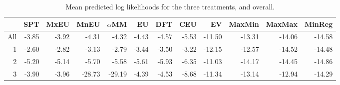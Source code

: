 \begin{table}[!htb]
\centering
\begin{tabular}{rrrrrrrrrrrr}
  \hline
 & SPT & MxEU & MnEU & $\alpha$MM & EU & DFT & CEU & EV & MaxMin & MaxMax & MinReg \\ 
  \hline
All & -3.85 & -3.92 & -4.31 & -4.32 & -4.43 & -4.57 & -5.53 & -11.50 & -13.31 & -14.06 & -14.58 \\ 
  1 & -2.60 & -2.82 & -3.13 & -2.79 & -3.44 & -3.50 & -3.22 & -12.15 & -12.57 & -14.52 & -14.48 \\ 
  2 & -5.20 & -5.14 & -5.70 & -5.58 & -5.61 & -5.93 & -6.35 & -11.03 & -14.17 & -14.45 & -14.86 \\ 
  3 & -3.90 & -3.96 & -28.73 & -29.19 & -4.39 & -4.53 & -8.68 & -11.34 & -13.14 & -12.94 & -14.29 \\ 
   \hline
\end{tabular}
\caption{Mean predicted log likelihoods for the three treatments, and overall.} 
\label{table1_mean_plike}
\end{table}
